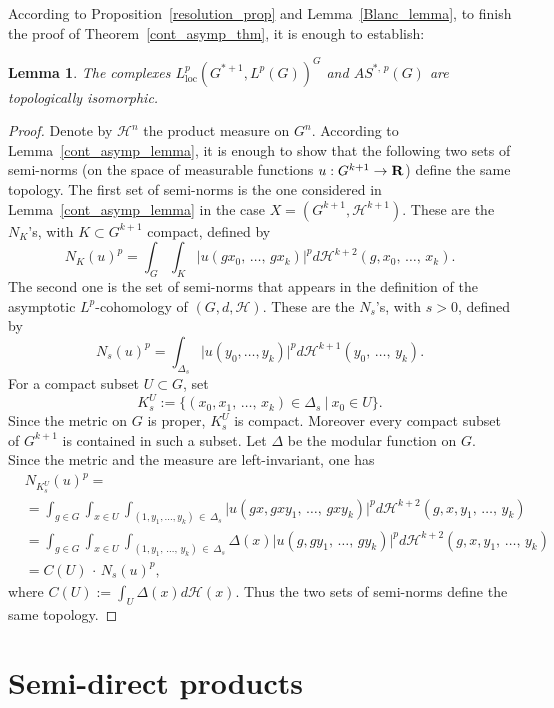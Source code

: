 \documentclass[11pt]{article}
\newtheorem{lemm}[theo]{Lemma}
\theoremstyle{definition}
\numberwithin{equation}{section}
\numberwithin{figure}{section}
\numberwithin{table}{section}
\DeclareMathOperator{\loc}{loc}
\begin{document}
According to Proposition~\ref{resolution_prop} and Lemma~\ref{Blanc_lemma}, to finish the proof of Theorem~\ref{cont_asymp_thm}, it is enough to establish:


\begin{lemm}
The complexes $L_{\loc}^p\left(G^{*+1}, L^p(G)\right)^G$ and $AS^{*,\,p}(G)$ are topologically isomorphic.
\end{lemm}

\begin{proof}
Denote by $\mathcal H ^n$ the product measure on $G^n$. According to Lemma~\ref{cont_asymp_lemma}, it is enough to show that the following two sets of semi-norms (on the space of measurable functions $u: G^{k+1} \to {\bf R}$) define the same topology. The first set of semi-norms is the one considered in Lemma~\ref{cont_asymp_lemma} in the case $X = (G ^{k+1}, \mathcal H ^{k+1})$. These are the $N_K$'s, with $K \subset G^{k+1}$ compact, defined by
\[
N_K (u) ^p = \int _G \int _K \bigl\vert u (gx_0,\,\dots,\,gx_k) \bigr\vert ^p d\mathcal H ^{k+2}(g, x_0,\,\dots,\,x_k).
\]
The second one is the set of semi-norms that appears in the definition of the asymptotic $L^p$-cohomology of $(G, d, \mathcal H)$. These are the $N_s$'s, with $s>0$, defined by
\[
N_s (u)^p = \int _{\Delta _s } \bigl\vert u (y_0,\dots, y_k)\bigr \vert^p
d\mathcal H ^{k+1} (y_0,\,\dots,\,y_k).
\]
For a compact subset $U \subset G$, set
\[
K _s ^U:= \{(x_0, x_1,\,\dots,\,x_k) \in \Delta _s~\vert~x_0 \in U\}.
\]
Since the metric on $G$ is proper, $ K _s ^U$ is compact. Moreover every compact subset of $G^{k+1}$ is contained in such a subset. Let $\Delta$ be the modular function on $G$. Since the metric and the measure are left-invariant, one has
\begin{align*}
&N _{K_s ^U} (u) ^p =\\
&=\int _{g \in G} \int _{x \in U} \int _{(1, y_1,\dots, y_k)\,\in\,\Delta _s }
\bigl\vert u(gx, gxy_1,\,\dots,\,gxy_k) \bigr\vert^p d\mathcal H ^{k+2}(g, x, y_1,\,\dots,\,y_k) \\
&=\int _{g \in G} \int _{x \in U} \int _{(1, y_1,\,\dots,\,y_k)\,\in\,\Delta _s } \Delta (x)
\bigl\vert u(g, gy_1,\,\dots,\,gy_k) \bigr\vert^p d\mathcal H ^{k+2}(g, x, y_1,\,\dots,\,y_k) \\
&= C(U)\,\cdot\,N_s (u) ^p,
\end{align*}
where $C(U):= \int _U \Delta (x) d\mathcal H (x)$. Thus the two sets of semi-norms define the same topology.
\end{proof}

\section{Semi-direct products}\label{5}
\end{document}
